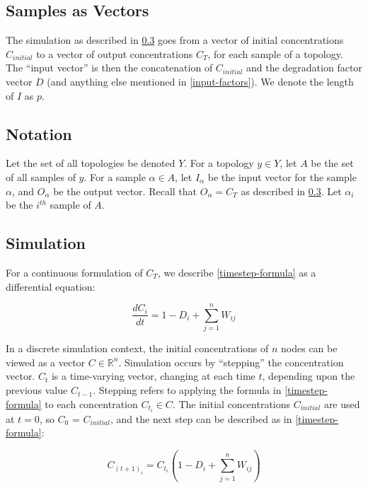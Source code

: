 \documentclass{article}
\begin{document}
\subsection{Samples as Vectors}
The simulation as described in \ref{simulation} goes from a vector of initial concentrations $C_{initial}$ to a vector of output concentrations $C_T$, for each sample of a topology. The ``input vector'' is then the concatenation of $C_{initial}$ and the degradation factor vector $D$ (and anything else mentioned in \ref{input-factors}). We denote the length of $I$ as $p$.

\subsection{Notation}

Let the set of all topologies be denoted $Y$. For a topology $y \in Y$, let $A$ be the set of all samples of $y$. For a sample $\alpha \in A$, let $I_{\alpha}$ be the input vector for the sample $\alpha$, and $O_{\alpha}$ be the output vector. Recall that $O_{\alpha} = C_T$ as described in \ref{simulation}. Let $\alpha_i$ be the $i^{th}$ sample of $A$.

\subsection{Simulation} \label{simulation}
For a continuous formulation of $C_T$, we describe \eqref{timestep-formula} as a differential equation:

\begin{equation} \label{diff-eq-formula}
  \frac{dC_i}{dt} = 1 - D_i + \sum_{j = 1}^n{W_{ij}}
\end{equation}

In a discrete simulation context, the initial concentrations of $n$ nodes can be viewed as a vector $C \in \mathbb{R}^n$. Simulation occurs by ``stepping'' the concentration vector. $C_t$ is a time-varying vector, changing at each time $t$, depending upon the previous value $C_{t - 1}$. Stepping refers to applying the formula in \eqref{timestep-formula} to each concentration $C_{t_i} \in C$. The initial concentrations $C_{initial}$ are used at $t = 0$, so $C_0$ = $C_{initial}$, and the next step can be described as in \eqref{timestep-formula}:

\begin{equation} \label{timestep-formula}
  C_{{(t + 1)}_i} = C_{t_i} (1 - D_i + \sum_{j = 1}^n{W_{ij}})
\end{equation}
\end{document}
